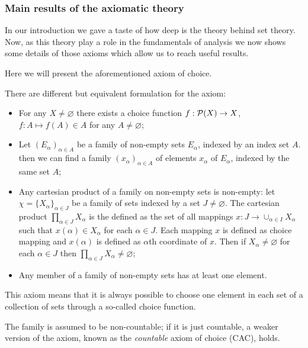 \subsubsection{Main results of the axiomatic theory} In our introduction we gave a taste of how deep is the theory behind set theory. Now, as this theory play a role in the fundamentals of analysis we now shows some details of those axioms which allow us to reach useful results. 

Here we will present the aforementioned axiom of choice.

\begin{defn} \label{axiom-of-choice}
	There are different but equivalent formulation for the axiom:
	\begin{itemize}
		\item For any $X \neq \varnothing$ there exists a choice function $f: \mathcal P(X) \to X$, $f:A \mapsto f(A)\in A$ for any $A \neq \varnothing$;
		\item Let $(E_{\alpha})_{\alpha \in A}$ be a family of non-empty sets $E_\alpha$, indexed by an index set $A$. then we can find a family $(x_\alpha)_{\alpha \in A}$ of elements $x_\alpha$ of $E_\alpha$, indexed by the same set $A$; \footnotemark{}
		\item Any cartesian product of a family on non-empty sets is non-empty: let $\chi = \{X_\alpha\}_{\alpha \in J}$ be a family of sets indexed by a set $J \neq \varnothing$. The cartesian product $\prod_{\alpha \in J} X_\alpha$ is the defined as the set of all mappings $x:J \to \cup_{\alpha \in I} X_\alpha$ such that $x(\alpha) \in X_\alpha$ for each $\alpha \in J$. Each mapping $x$ is defined as choice mapping and $x(\alpha)$ is defined as $\alpha$th coordinate of $x$. Then if $X_\alpha \neq \varnothing$ for each $\alpha \in J$ then $\prod_{\alpha \in J} X_\alpha \neq \varnothing$;
		\item Any member of a family of non-empty sets has at least one element.
	\end{itemize}
\end{defn}

This axiom means that it is always possible to choose one element in each set of a collection of sets through a so-called choice function.

The family is assumed to be non-countable; if it is just countable, a weaker version of the axiom, known as the \textit{countable} axiom of choice (CAC), holds.

